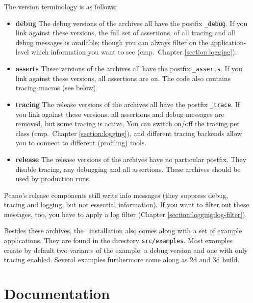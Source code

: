 The version terminology is as follows:
\begin{itemize}
  \item {\bf debug} The debug versions of the archives all have the postfix
  \texttt{\_debug}. If you link against these versions, the full set of
  assertions, of all tracing and all debug messages is available; though you can
  always filter on the application-level which information you want to see
  (cmp.~Chapter \ref{section:logging}).
  \item {\bf asserts} Thsee versions of the archives all have the postfix
  \texttt{\_asserts}. If you link against these versions, all assertions are on.
  The code also contains tracing macros (see below).
  \item {\bf tracing} The release versions of the archives all have the postfix
  \texttt{\_trace}. If you link against these versions, all assertions and debug
  messages are removed, but some tracing is active. You can switch on/off the
  tracing per class (cmp.~Chapter \ref{section:logging}), and different tracing
  backends allow you to connect to different (profiling) tools.
  \item {\bf release} The release versions of the archives have no
  particular postfix. They disable tracing, any debugging and all assertions.
  These archives should be used by production runs.
\end{itemize}


\begin{remark}
 Peano's release components still write info messages (they suppress debug,
 tracing and logging, but not essential information). If you want to filter out
 these messages, too, you have to apply a log filter (Chapter
 \ref{section:logging:log-filter}).
\end{remark}


\noindent
Besides these archives, the \Peano\ installation also comes along with a set of
example applications.
They are found in the directory \texttt{src/examples}.
Most examples create by default two variants of the example: a debug
version and one with only tracing enabled.
Several examples furthermore come along as 2d and 3d build.



\section{Documentation}


